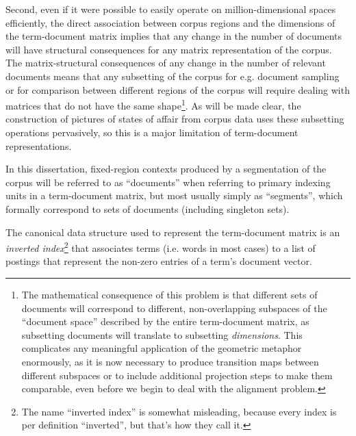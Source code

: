 Second, even if it were possible to easily operate on million-dimensional spaces efficiently, the direct association between corpus regions and the dimensions of the term-document matrix implies that any change in the number of documents will have structural consequences for any matrix representation of the corpus.
The matrix-structural consequences of any change in the number of relevant documents means that any subsetting of the corpus for e.g. document sampling or for comparison between different regions of the corpus will require dealing with matrices that do not have the same shape\footnote{
    The mathematical consequence of this problem is that different sets of documents will correspond to different, non-overlapping subspaces of the ``document space'' described by the entire term-document matrix, as subsetting documents will translate to subsetting \emph{dimensions}.
    This complicates any meaningful application of the geometric metaphor enormously, as it is now necessary to produce transition maps between different subspaces or to include additional projection steps to make them comparable, even before we begin to deal with the alignment problem.
}.
As will be made clear, the construction of pictures of states of affair from corpus data uses these subsetting operations pervasively, so this is a major limitation of term-document representations.

In this dissertation, fixed-region contexts produced by a segmentation of the corpus will be referred to as ``documents'' when referring to primary indexing units in a term-document matrix, but most usually simply as ``segments'', which formally correspond to sets of documents (including singleton sets).

The canonical data structure used to represent the term-document matrix is an \emph{inverted index}\footnote{
    The name ``inverted index'' is somewhat misleading, because every index is per definition ``inverted'', but that's how they call it.
} that associates terms (i.e. words in most cases) to a list of postings that represent the non-zero entries of a term's document vector.


